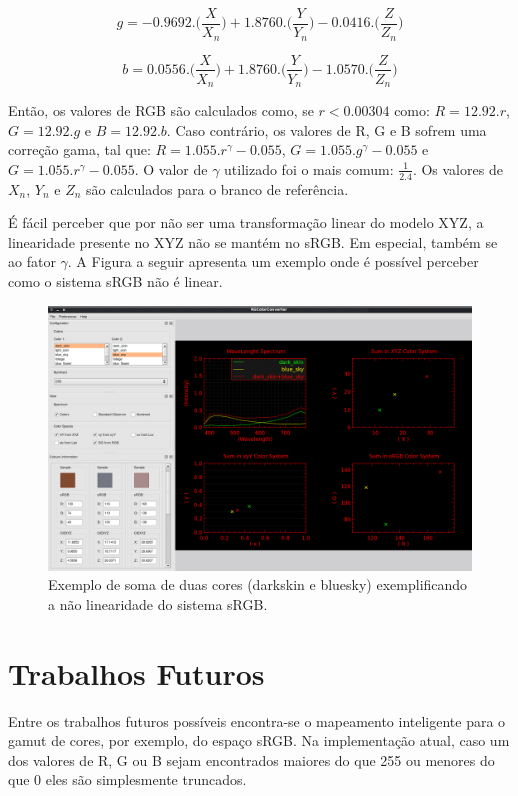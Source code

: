 \begin{equation}\label{eq:sRGB_g}
g=-0.9692.\Big(\frac{X}{X_n}\Big)+1.8760.\Big(\frac{Y}{Y_n}
\Big)-0.0416.\Big(\frac{Z}{Z_n}\Big)
\end{equation}

\begin{equation}\label{eq:sRGB_b}
b=0.0556.\Big(\frac{X}{X_n}\Big)+1.8760.\Big(\frac{Y}{Y_n}
\Big)-1.0570.\Big(\frac{Z}{Z_n}\Big)
\end{equation}

\par
Então, os valores de RGB são calculados como, se $ r < 0.00304 $ como:
$R=12.92.r$, $G=12.92.g$ e $B=12.92.b$. Caso contrário, os valores de R, G e B
sofrem uma correção gama, tal que: $R=1.055.r^\gamma-0.055$,
$G=1.055.g^\gamma-0.055$ e $G=1.055.r^\gamma-0.055$. O valor de $\gamma$
utilizado foi o mais comum: $\frac{1}{2.4}$. Os valores de $X_n$, $Y_n$ e $Z_n$
são calculados para o branco de referência.

\par
É fácil perceber que por não ser uma transformação linear do modelo XYZ, a
linearidade presente no XYZ não se mantém no sRGB. Em especial, também se ao
fator $\gamma$. A Figura a seguir apresenta um exemplo onde é possível
perceber como o sistema sRGB não é linear.

\begin{figure}[!htb]
     \centering
     \includegraphics[scale=0.6]{img/srgb_no_linearity.png}
     \caption{Exemplo de soma de duas cores (darkskin e bluesky)
exemplificando a não linearidade do sistema sRGB.}
     \label{fig:luv_no_linearity}
\end{figure}

\section{Trabalhos Futuros}
\par
Entre os trabalhos futuros possíveis encontra-se o mapeamento inteligente para o
gamut de cores, por exemplo, do espaço sRGB. Na implementação atual, caso um
dos valores de R, G ou B sejam encontrados maiores do que 255 ou menores do que
0 eles são simplesmente truncados.

